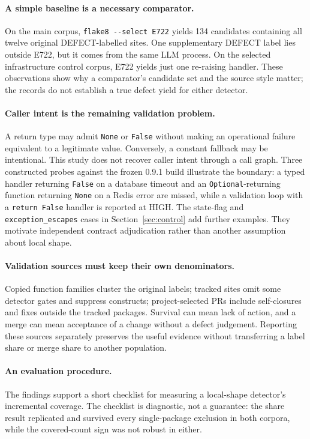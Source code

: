 \documentclass[10pt,a4paper]{article}
\begin{document}
\paragraph{A simple baseline is a necessary comparator.}
On the main corpus, \texttt{flake8 -{}-select E722} yields 134 candidates
containing all twelve original DEFECT-labelled sites. One supplementary
DEFECT label lies outside E722, but it comes from the same LLM process.
On the selected infrastructure control corpus, E722 yields just one
re-raising handler. These observations show why a comparator's candidate
set and the source style matter; the records do not establish a true
defect yield for either detector.

\paragraph{Caller intent is the remaining validation problem.}
A return type may admit \texttt{None} or \texttt{False} without making an
operational failure equivalent to a legitimate value. Conversely, a
constant fallback may be intentional. This study does not recover caller
intent through a call graph. Three constructed probes against the frozen
0.9.1 build illustrate the boundary: a typed handler returning
\texttt{False} on a database timeout and an \texttt{Optional}-returning
function returning \texttt{None} on a Redis error are missed, while a
validation loop with a \texttt{return False} handler is reported at HIGH.
The state-flag and \texttt{exception\_escapes} cases in
Section~\ref{sec:control} add further examples. They motivate independent
contract adjudication rather than another assumption about local shape.

\paragraph{Validation sources must keep their own denominators.}
Copied function families cluster the original labels; tracked sites omit
some detector gates and suppress constructs; project-selected PRs include
self-closures and fixes outside the tracked packages. Survival can mean
lack of action, and a merge can mean acceptance of a change without a
defect judgement. Reporting these sources separately preserves the useful
evidence without transferring a label share or merge share to another
population.

\paragraph{An evaluation procedure.}
The findings support a short checklist for measuring a local-shape detector's
incremental coverage. The checklist is diagnostic, not a guarantee: the share
result replicated and survived every single-package exclusion in both corpora,
while the covered-count sign was not robust in either.
\end{document}
